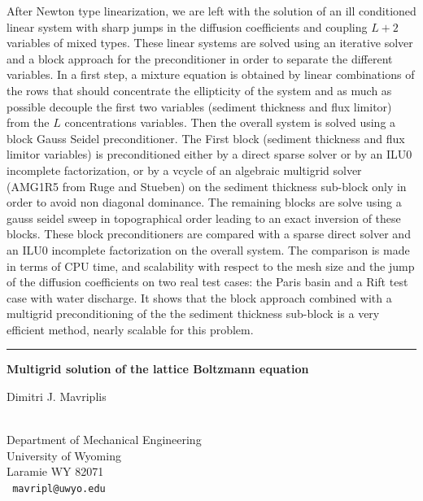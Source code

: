 \documentclass[twosided]{report}
\begin{document}
After Newton type
linearization, we are left with the solution of an ill conditioned
linear system with sharp jumps in the diffusion coefficients and
coupling $L+2$ variables of mixed types. These linear systems are solved
using an iterative solver and a block approach for the preconditioner
in order to separate the different variables. In a first step, a
mixture equation is obtained by linear combinations of the rows that
should concentrate the ellipticity of the system and as much as
possible decouple the first two variables (sediment thickness and flux
limitor) from the $L$ concentrations variables. Then the overall system
is solved using a block Gauss Seidel preconditioner. The First block
(sediment thickness and flux limitor variables) is preconditioned
either by a direct sparse solver or by an ILU0 incomplete
factorization, or by a vcycle of an algebraic multigrid solver (AMG1R5
from Ruge and Stueben) on the sediment thickness sub-block only in order
to avoid non diagonal dominance. The remaining blocks are solve using a
gauss seidel sweep in topographical order leading to an exact inversion
of these blocks. These block preconditioners are compared with a sparse
direct solver and an ILU0 incomplete factorization on the overall
system. The comparison is made in terms of CPU time, and scalability
with respect to the mesh size and the jump of the diffusion
coefficients on two real test cases: the Paris basin and a Rift test
case with water discharge. It shows that the block approach combined
with a multigrid preconditioning of the the sediment thickness
sub-block is a very efficient method, nearly scalable for this problem.


\begin{center} \rule{6in}{1pt} \end{center}
\newpage	%


\begin{center}
{\large			\label{mavriplis}
{\bf
Multigrid solution of the lattice Boltzmann equation
}

Dimitri J. Mavriplis} \\ 
Department of Mechanical Engineering \\
University of Wyoming \\
Laramie WY 82071
\\ {\tt
mavripl@uwyo.edu
}
\end{center}
\end{document}
